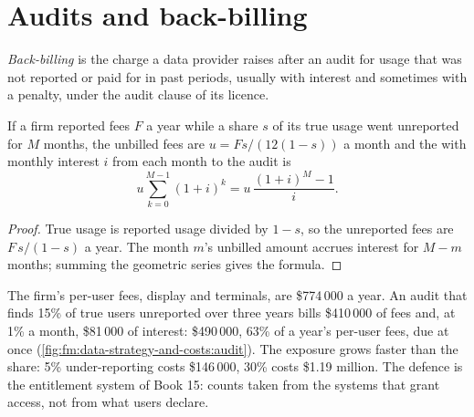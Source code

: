 \label{lst:fm:data-strategy-and-costs:budget}

\section{Audits and back-billing}

\begin{definition}\label{def:fm:data-strategy-and-costs:backbill}
\emph{Back-billing} is the charge a data provider raises after an audit for usage that was not reported or paid for in past
periods, usually with interest and sometimes with a penalty, under the audit clause of its licence.
\end{definition}

\begin{proposition}\label{prop:fm:data-strategy-and-costs:audit}
If a firm reported fees $F$ a year while a share $s$ of its true usage went unreported for $M$ months, the unbilled fees are $u=Fs/(12(1-s))$ a
month and the  with monthly interest $i$ from each month to the audit is
\[
u\sum_{k=0}^{M-1}(1+i)^k=u\,\frac{(1+i)^M-1}{i}.
\]
\end{proposition}

\begin{proof}
True usage is reported usage divided by $1-s$, so the unreported fees are $F\,s/(1-s)$ a year. The month $m$'s unbilled amount accrues interest for
$M-m$ months; summing the geometric series gives the formula.
\end{proof}

The firm's per-user fees, display and terminals, are \$774\,000 a year. An audit that finds 15\% of true users unreported over three years bills
\$410\,000 of fees and, at 1\% a month, \$81\,000 of interest: \$490\,000, 63\% of a year's per-user fees, due at once
(\cref{fig:fm:data-strategy-and-costs:audit}). The exposure grows faster than the share: 5\% under-reporting costs \$146\,000, 30\% costs
\$1.19 million. The defence is the entitlement system of Book 15: counts taken from the systems that grant access, not from what users declare.

